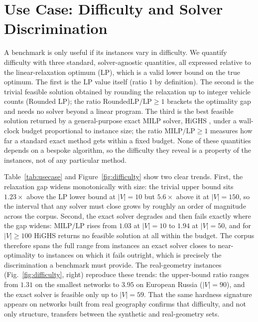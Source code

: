 \documentclass[runningheads]{llncs}
\begin{document}
\section{Use Case: Difficulty and Solver Discrimination}
\label{sec:usecase}

A benchmark is only useful if its instances vary in difficulty. We quantify
difficulty with three standard, solver-agnostic quantities, all expressed
relative to the linear-relaxation optimum (LP), which is a valid lower bound on
the true optimum. The first is the LP value itself (ratio $1$ by definition). The
second is the trivial feasible solution obtained by rounding the relaxation up to
integer vehicle counts (Rounded LP); the ratio $\text{RoundedLP}/\text{LP}\ge1$
brackets the optimality gap and needs no solver beyond a linear program. The
third is the best feasible solution returned by a general-purpose exact MILP
solver, HiGHS \cite{highs}, under a wall-clock budget proportional to instance
size; the ratio $\text{MILP}/\text{LP}\ge1$ measures how far a standard exact
method gets within a fixed budget. None of these quantities depends on a bespoke
algorithm, so the difficulty they reveal is a property of the instances, not of
any particular method.

Table~\ref{tab:usecase} and Figure~\ref{fig:difficulty} show two clear trends.
First, the relaxation gap widens monotonically with size: the trivial upper bound
sits $1.23\times$ above the LP lower bound at $|V|=10$ but $5.6\times$ above it at
$|V|=150$, so the interval that any solver must close grows by roughly an order of
magnitude across the corpus. Second, the exact solver degrades and then fails
exactly where the gap widens: $\text{MILP}/\text{LP}$ rises from $1.03$ at
$|V|=10$ to $1.94$ at $|V|=50$, and for $|V|\ge100$ HiGHS returns no feasible
solution at all within the budget. The corpus therefore spans the full range from
instances an exact solver closes to near-optimality to instances on which it
fails outright, which is precisely the discrimination a benchmark must provide.
The real-geometry instances (Fig.~\ref{fig:difficulty}, right) reproduce these
trends: the upper-bound ratio ranges from $1.31$ on the smallest networks to
$3.95$ on European Russia ($|V|=90$), and the exact solver is feasible only up to
$|V|=59$. That the same hardness signature appears on networks built from real
geography confirms that difficulty, and not only structure, transfers between the
synthetic and real-geometry sets.
\end{document}
